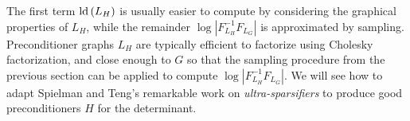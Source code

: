 The first term $\text{\textnormal{ld}}\left(L_{H}\right)$ is usually easier to compute
by considering the graphical properties of $L_{H}$, while the remainder
$\log\left|F_{L_{H}}^{-1}F_{L_{G}}\right|$ is approximated by sampling.
Preconditioner graphs $L_{H}$ are typically efficient to factorize
using Cholesky factorization, and close enough to $G$ so that the
sampling procedure from the previous section can be applied to compute
$\log\left|F_{L_{H}}^{-1}F_{L_{G}}\right|$. We will see how to adapt
Spielman and Teng's remarkable work on \emph{ultra-sparsifiers} to
produce good preconditioners $H$ for the determinant.
